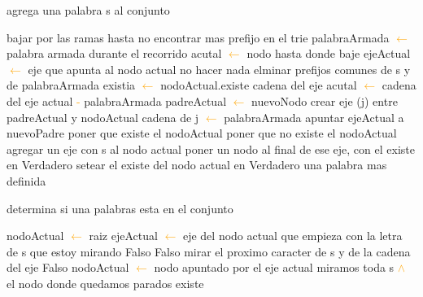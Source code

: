 \begin{algorithm}
\caption{agrega una palabra s al conjunto}
\begin{algorithmic}[1]
\STATE bajar por las ramas hasta no encontrar mas prefijo en el trie
\STATE palabraArmada \textcolor{orange}{$\leftarrow$} palabra armada durante el recorrido
\STATE acutal \textcolor{orange}{$\leftarrow$} nodo hasta donde baje
\STATE ejeActual \textcolor{orange}{$\leftarrow$} eje que apunta al nodo actual
	\STATE no hacer nada
\ELSE
	\STATE elminar prefijos comunes de s y de palabraArmada
		\STATE {} 
		\STATE existia \textcolor{orange}{$\leftarrow$} nodoActual.existe
		\STATE cadena del eje acutal \textcolor{orange}{$\leftarrow$} cadena del eje actual \textcolor{orange}{-} palabraArmada  
		\STATE padreActual \textcolor{orange}{$\leftarrow$} nuevoNodo 
		\STATE crear eje (j) entre padreActual y nodoActual
		\STATE cadena de j \textcolor{orange}{$\leftarrow$} palabraArmada
		\STATE apuntar ejeActual a nuevoPadre 
			\STATE poner que existe el nodoActual
		\ELSE
			\STATE poner que no existe el nodoActual
		\ENDIF
\ENDIF
\ENDIF
		\STATE agregar un eje con s al nodo actual
		\STATE poner un nodo al final de ese eje, con el existe en \textcolor{NavyBlue}{Verdadero}
	\ELSE
		\STATE setear el existe del nodo actual en \textcolor{NavyBlue}{Verdadero}
	\ENDIF
\STATE una palabra mas definida
\end{algorithmic}
\end{algorithm}

\begin{algorithm}
\caption{determina si una palabras esta en el conjunto}
\begin{algorithmic}[1]
		\STATE nodoActual \textcolor{orange}{$\leftarrow$} raiz
			\STATE ejeActual \textcolor{orange}{$\leftarrow$}	eje del nodo actual que empieza con la letra de s que estoy mirando
				\RETURN \textcolor{WildStrawberry}{Falso}
				\ENDIF
				\RETURN \textcolor{WildStrawberry}{Falso}
				\ENDIF
				\STATE mirar el proximo caracter de s y de la cadena del eje	
		\ENDWHILE
		\STATE{}
		\RETURN \textcolor{WildStrawberry}{Falso}
		\ENDIF
		\STATE nodoActual \textcolor{orange}{$\leftarrow$} nodo apuntado por el eje actual
		\ENDWHILE
		 \RETURN miramos toda s \textcolor{orange}{$\wedge$} el nodo donde quedamos	parados existe	
\end{algorithmic}
\end{algorithm}		





